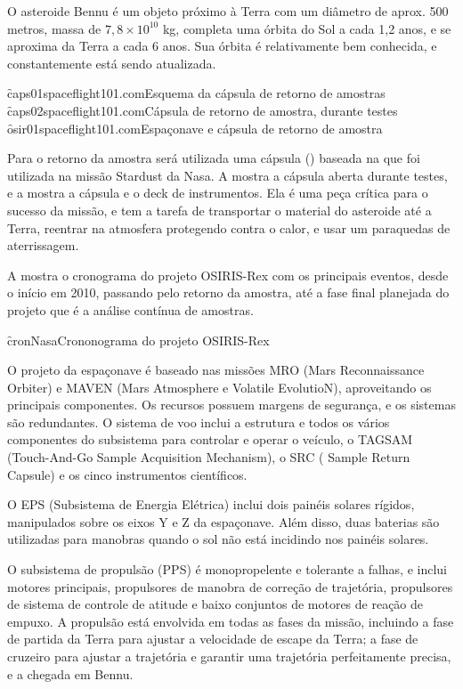 O asteroide Bennu é um objeto próximo à Terra com um diâmetro de aprox. 500 metros, massa de $ 7,8 \times 10^{10} $ kg, completa uma órbita do Sol a cada 1,2 anos, e se aproxima da Terra a cada 6 anos. Sua órbita é relativamente bem conhecida, e constantemente está sendo atualizada.

\f{caps01}{spaceflight101.com}{Esquema da cápsula de retorno de amostras}
\f{caps02}{spaceflight101.com}{Cápsula de retorno de amostra, durante testes}
\f{osir01}{spaceflight101.com}{Espaçonave e cápsula de retorno de amostra}

Para o retorno da amostra será utilizada uma cápsula () baseada na que foi utilizada na missão Stardust da Nasa. A  mostra a cápsula aberta durante testes, e a  mostra a cápsula e o deck de instrumentos. Ela é uma peça crítica para o sucesso da missão, e tem a tarefa de transportar o material do asteroide até a Terra, reentrar na atmosfera protegendo contra o calor, e usar um paraquedas de aterrissagem.

A  mostra o cronograma do projeto OSIRIS-Rex com os principais eventos, desde o início em 2010, passando pelo retorno da amostra, até a fase final planejada do projeto que é a análise contínua de amostras.

\f{cron}{Nasa}{Crononograma do projeto OSIRIS-Rex}

O projeto da espaçonave é baseado nas missões MRO (Mars Reconnaissance Orbiter) e MAVEN (Mars Atmosphere e Volatile EvolutioN), aproveitando os principais componentes. Os recursos possuem margens de segurança, e os sistemas são redundantes. O sistema de voo inclui a estrutura e todos os vários componentes do subsistema para controlar e operar o veículo, o TAGSAM (Touch-And-Go Sample Acquisition Mechanism), o SRC ( Sample Return Capsule) e os cinco instrumentos científicos.

O EPS (Subsistema de Energia Elétrica) inclui dois painéis solares rígidos, manipulados sobre os eixos Y e Z da espaçonave. Além disso, duas baterias são utilizadas para manobras quando o sol não está incidindo nos painéis solares.

O subsistema de propulsão (PPS)  é monopropelente e tolerante a falhas, e inclui motores principais, propulsores de manobra de correção de trajetória, propulsores de sistema de controle de atitude e baixo conjuntos de motores de reação de empuxo. A propulsão está envolvida em todas as fases da missão, incluindo a fase de partida da Terra para ajustar a velocidade de escape da Terra; a fase de cruzeiro para ajustar a trajetória e garantir uma trajetória perfeitamente precisa, e a chegada em Bennu.

